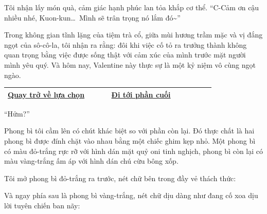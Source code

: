 \documentclass[../main.tex]{subfiles}
\begin{document}
Tôi nhận lấy món quà, cảm giác hạnh phúc lan tỏa khắp cơ thể. ``C-Cảm ơn cậu nhiều nhé, Kuon-kun\dots\ Mình sẽ trân trọng nó lắm đó\~{}''

Trong không gian tĩnh lặng của tiệm trà cổ, giữa mùi hương trầm mặc và vị đắng ngọt của sô-cô-la, tôi nhận ra rằng: đôi khi việc cố tỏ ra trưởng thành không quan trọng bằng việc được sống thật với cảm xúc của mình trước mặt người mình yêu quý. Và hôm nay, Valentine này thực sự là một kỷ niệm vô cùng ngọt ngào.

\begin{table}[H]
  \centering
  \setlength{\arrayrulewidth}{1pt}
  \begin{tabular}{|>{\centering\arraybackslash}p{0.4\linewidth}|>{\centering\arraybackslash}p{0.4\linewidth}|}
    \hline
    \hyperref[choice]{Quay trở về lựa chọn} & \hyperref[ending]{Đi tới phần cuối} \\ \hline
  \end{tabular}
\end{table}

\newpage
\label{ayawata}

``Hửm?''

Phong bì tôi cầm lên có chút khác biệt so với phần còn lại. Đó thực chất là hai phong bì được đính chặt vào nhau bằng một chiếc ghim kẹp nhỏ. Một phong bì có màu đỏ-trắng rực rỡ với hình dán mặt quỷ oni tinh nghịch, phong bì còn lại có màu vàng-trắng ấm áp với hình dán chú cừu bông xốp.

Tôi mở phong bì đỏ-trắng ra trước, nét chữ bên trong đầy vẻ thách thức:


Và ngay phía sau là phong bì vàng-trắng, nét chữ dịu dàng như đang cố xoa dịu lời tuyên chiến ban nãy:

\end{document}
